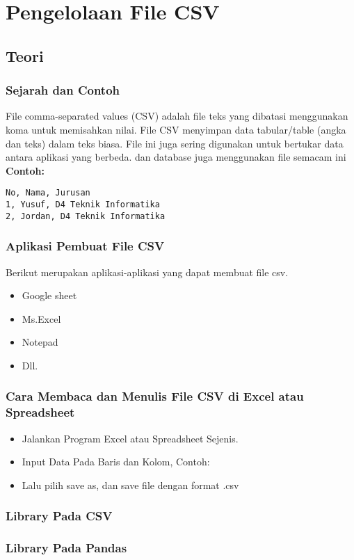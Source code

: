 \chapter{Pengelolaan File CSV}
\section{Teori}
\subsection{Sejarah dan Contoh}
File comma-separated values (CSV) adalah file teks yang dibatasi menggunakan koma untuk memisahkan nilai. File CSV menyimpan data tabular/table (angka dan teks) dalam teks biasa. File ini juga sering digunakan untuk bertukar data antara aplikasi yang berbeda. dan database juga menggunakan file semacam ini\\
\textbf{Contoh:}
\begin{lstlisting}
No, Nama, Jurusan
1, Yusuf, D4 Teknik Informatika
2, Jordan, D4 Teknik Informatika
\end{lstlisting}

\subsection{Aplikasi Pembuat File CSV}
Berikut merupakan aplikasi-aplikasi yang dapat membuat file csv.
\begin{itemize}
\item Google sheet
\item Ms.Excel
\item Notepad
\item Dll.
\end{itemize}

\subsection{Cara Membaca dan Menulis File CSV di Excel atau Spreadsheet}
\begin{itemize}
\item Jalankan Program Excel atau Spreadsheet Sejenis.
\item Input Data Pada Baris dan Kolom, Contoh:
\item Lalu pilih save as, dan save file dengan format .csv
\end{itemize}

\subsection{Library Pada CSV}






\subsection{Library Pada Pandas}

